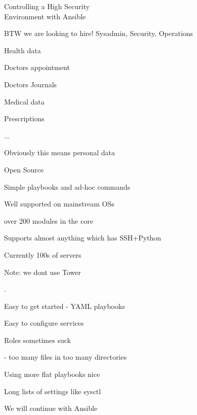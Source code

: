 \documentclass[17pt,Screen16to9,footrule]{foils}
\begin{document}

\mytitlepage
{Controlling a High Security \\Environment with Ansible}


BTW we are looking to hire! Sysadmin, Security, Operations
\LogoOn



\begin{list1}
\item Health data
\item Doctors appointment
\item Doctors Journals
\item Medical data
\item Prescriptions
\item ...
\item Obviously this means personal data
\end{list1}




\begin{list1}
\item Open Source \smiley
\item Simple playbooks and ad-hoc commands
\item Well supported on mainstream OSs
\item over 200 modules in the core
\item Supports almost anything which has SSH+Python
\item Currently 100s of servers
\end{list1}


Note: we dont use Tower


.
\begin{list1}
\item Easy to get started - YAML playbooks
\item Easy to configure services
\item Roles sometimes suck
\item - too many files in too many directories
\item Using more flat playbooks nice
\item Long lists of settings like sysctl
\item We will continue with Ansible
\end{list1}
\end{document}
